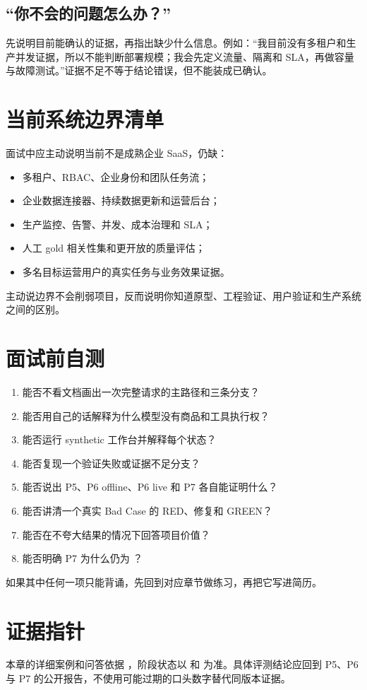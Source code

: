 \subsection{“你不会的问题怎么办？”}

先说明目前能确认的证据，再指出缺少什么信息。例如：“我目前没有多租户和生产并发证据，所以不能判断部署规模；我会先定义流量、隔离和 SLA，再做容量与故障测试。”证据不足不等于结论错误，但不能装成已确认。

\section{当前系统边界清单}

面试中应主动说明当前不是成熟企业 SaaS，仍缺：

\begin{itemize}
  \item 多租户、RBAC、企业身份和团队任务流；
  \item 企业数据连接器、持续数据更新和运营后台；
  \item 生产监控、告警、并发、成本治理和 SLA；
  \item 人工 gold 相关性集和更开放的质量评估；
  \item 多名目标运营用户的真实任务与业务效果证据。
\end{itemize}

主动说边界不会削弱项目，反而说明你知道原型、工程验证、用户验证和生产系统之间的区别。

\section{面试前自测}

\begin{enumerate}
  \item 能否不看文档画出一次完整请求的主路径和三条分支？
  \item 能否用自己的话解释为什么模型没有商品和工具执行权？
  \item 能否运行 synthetic 工作台并解释每个状态？
  \item 能否复现一个验证失败或证据不足分支？
  \item 能否说出 P5、P6 offline、P6 live 和 P7 各自能证明什么？
  \item 能否讲清一个真实 Bad Case 的 RED、修复和 GREEN？
  \item 能否在不夸大结果的情况下回答项目价值？
  \item 能否明确 P7 为什么仍为 \statusprogress？
\end{enumerate}

如果其中任何一项只能背诵，先回到对应章节做练习，再把它写进简历。

\section{证据指针}

本章的详细案例和问答依据 ，阶段状态以  和  为准。具体评测结论应回到 P5、P6 与 P7 的公开报告，不使用可能过期的口头数字替代同版本证据。
